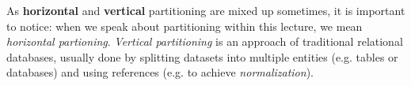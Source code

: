 {\hspace*{4mm}%
\hspace*{4mm}%
\begin{minipage}{0.8\textwidth}\raggedright
As \textbf{horizontal} and \textbf{vertical} partitioning are mixed up sometimes, it is important to notice: when we speak about partitioning within this lecture, we mean \textit{horizontal partioning}. \textit{Vertical partitioning} is an approach of traditional relational databases, usually done by splitting datasets into multiple entities (e.g. tables or databases) and using references (e.g. to achieve \textit{normalization}). \\
\end{minipage}

}
